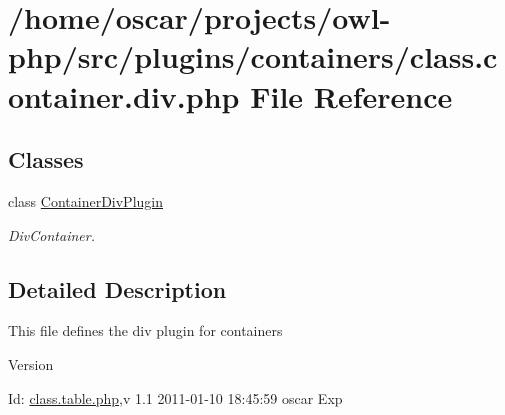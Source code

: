 \section{/home/oscar/projects/owl-\/php/src/plugins/containers/class.container.div.php File Reference}
\label{class_8container_8div_8php}
\subsection*{Classes}
\begin{DoxyCompactItemize}
\item 
class \hyperlink{classContainerDivPlugin}{ContainerDivPlugin}
\begin{DoxyCompactList}\small\item\em DivContainer. \item\end{DoxyCompactList}\end{DoxyCompactItemize}


\subsection{Detailed Description}
This file defines the div plugin for containers \begin{DoxyVersion}{Version}

\end{DoxyVersion}
\begin{DoxyParagraph}{Id:}
\hyperlink{class_8table_8php}{class.table.php},v 1.1 2011-\/01-\/10 18:45:59 oscar Exp 
\end{DoxyParagraph}
